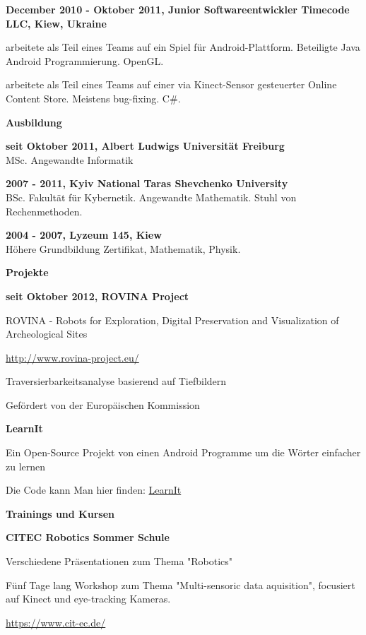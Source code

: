 \documentclass[a4paper,12pt,final]{memoir}
\newcommand{\SmallSep}{\vspace{0.5em}}
\newcommand{\CVSection}[1]
	{\Large\textbf{#1}\par
	\SmallSep\normalsize\normalfont}
\newcommand{\CVItem}[1]
	{\textbf{\color{MidnightBlue} #1}}
\begin{document}
\CVItem{December 2010 - Oktober 2011, Junior Softwareentwickler
\newline Timecode LLC, Kiew, Ukraine}
\begin{compactitem}[\color{MidnightBlue}$\circ$]
\item arbeitete als Teil eines Teams auf ein Spiel f\"{u}r Android-Plattform. Beteiligte Java Android Programmierung. OpenGL.
\item arbeitete als Teil eines Teams auf einer via Kinect-Sensor gesteuerter Online Content Store. Meistens bug-fixing. C\#.
\end{compactitem}
\SmallSep

\CVSection{Ausbildung}
\CVItem{seit Oktober 2011, Albert Ludwigs Universit\"{a}t Freiburg}\\
MSc. Angewandte Informatik
\SmallSep

\CVItem{2007 - 2011, Kyiv National Taras Shevchenko University}\\
BSc. Fakult\"{a}t f\"{u}r Kybernetik. Angewandte Mathematik. 
\newline Stuhl von Rechenmethoden.
\SmallSep

\CVItem{2004 - 2007, Lyzeum 145, Kiew}\\
H\"{o}here Grundbildung Zertifikat, Mathematik, Physik.
\SmallSep
\framebreak
\clearpage
\framebreak
\framebreak

\CVSection{Projekte}
\CVItem{seit Oktober 2012, ROVINA Project}
\begin{compactitem}[\color{MidnightBlue}$\circ$]
	\item ROVINA - Robots for Exploration, Digital Preservation and Visualization of Archeological Sites
	\item \href{http://www.rovina-project.eu/}{http://www.rovina-project.eu/} 
	\item Traversierbarkeitsanalyse basierend auf Tiefbildern
	\item Gef\"{o}rdert von der Europ\"{a}ischen Kommission
\end{compactitem}
\CVItem{LearnIt}
\begin{compactitem}[\color{MidnightBlue}$\circ$]
	\item Ein Open-Source Projekt von einen Android Programme um die W\"{o}rter
        einfacher zu lernen
	\item Die Code kann Man hier finden: \href{https://github.com/niosus/LearnIt}{LearnIt}  
\end{compactitem}
\SmallSep

\CVSection{Trainings und Kursen}
\CVItem{CITEC Robotics Sommer Schule}
\begin{compactitem}[\color{MidnightBlue}$\circ$]
	\item Verschiedene Pr\"{a}sentationen zum Thema "Robotics"
	\item F\"{u}nf Tage lang Workshop zum Thema "Multi-sensoric data
        aquisition", focusiert auf Kinect und eye-tracking Kameras.
	\item \href{https://www.cit-ec.de/}{https://www.cit-ec.de/} 
\end{compactitem}
\SmallSep
\end{document}
